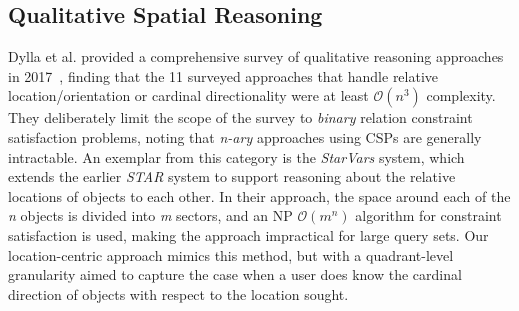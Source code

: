 \subsection{Qualitative Spatial Reasoning}
\par{Dylla et al. provided a comprehensive survey of qualitative reasoning approaches in 2017~\cite{Dylla2017}, finding that the 11 surveyed approaches that handle relative location/orientation or cardinal directionality were at least $\mathcal{O}(n^3)$ complexity. 
They deliberately limit the scope of the survey to \textit{binary} relation constraint satisfaction problems, noting that \textit{n-ary} approaches using CSPs are generally intractable.
An exemplar from this category is the \textit{StarVars} system, which extends the earlier \textit{STAR} system to support reasoning about the relative locations of objects to each other.
In their approach, the space around each of the \textit{n} objects is divided into \textit{m} sectors, and an NP $\mathcal{O}(m^n)$ algorithm for constraint satisfaction is used, making the approach impractical for large query sets.
Our location-centric approach mimics this method, but with a quadrant-level granularity aimed to capture the case when a user does know the cardinal direction of objects with respect to the location sought.}




